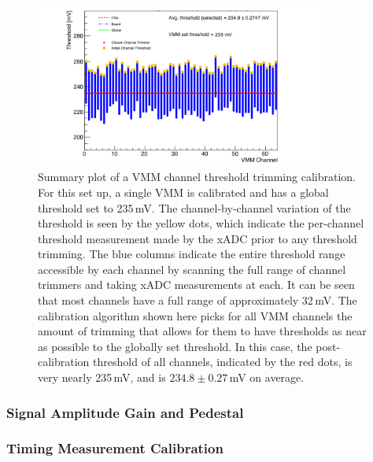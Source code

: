 \begin{figure}[!htb]
    \begin{center}
        \includegraphics[width=0.85\textwidth]{figures/nsw/calibration/channel_threshold_calibPDF}
        \caption{
            Summary plot of a VMM channel threshold trimming calibration.
            For this set up, a single VMM is calibrated and has a global threshold
            set to 235\,mV.
            The channel-by-channel variation of the threshold is seen by the yellow dots,
            which indicate the per-channel threshold measurement made by the xADC prior to any
            threshold trimming.
            The blue columns indicate the entire threshold range accessible by each channel
            by scanning the full range of channel trimmers and taking xADC measurements at each.
            It can be seen that most channels have a full range of approximately 32\,mV.
            The calibration algorithm shown here picks for all VMM channels the amount of trimming
            that allows for them to have thresholds as near as possible to the globally set threshold.
            In this case, the post-calibration threshold of all channels, indicated by the red dots,
            is very nearly 235\,mV, and is $234.8\pm 0.27$\,mV on average.
        }
        \label{fig:calib_channel_trim}
    \end{center}
\end{figure}

\subsubsection{Signal Amplitude Gain and Pedestal}
\label{sec:calib_pdo}

\subsubsection{Timing Measurement Calibration}
\label{sec:calib_tod}

